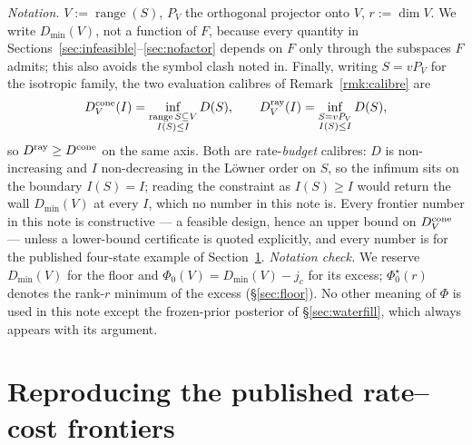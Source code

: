 \documentclass[journal]{IEEEtran}
\theoremstyle{remark}
\begin{document}
\emph{Notation.} $V:=\operatorname{range}(S)$, $P_V$ the orthogonal projector
onto $V$, $r:=\dim V$. We write $D_{\min}(V)$, not a function of $F$, because
every quantity in Sections~\ref{sec:infeasible}--\ref{sec:nofactor} depends on
$F$ only through the subspaces $F$ admits; this also avoids the symbol clash
noted in. Finally, writing $S=vP_V$ for the isotropic
family, the two evaluation calibres of
Remark~\ref{rmk:calibre} are
\[
 D^{\rm cone}_{V}(I)=\inf_{\substack{\operatorname{range}S\subseteq V\\
 I(S)\le I}}D(S),\qquad
 D^{\rm ray}_{V}(I)=\inf_{\substack{S=vP_V\\ I(S)\le I}}D(S),
\]
so $D^{\rm ray}\ge D^{\rm cone}$ on the same axis. Both are rate-\emph{budget}
calibres: $D$ is non-increasing and $I$ non-decreasing in the L\"owner order on
$S$, so the infimum sits on the boundary $I(S)=I$; reading the constraint as
$I(S)\ge I$ would return the wall $D_{\min}(V)$ at every $I$, which no number in
this note is. Every frontier number in this
note is constructive --- a feasible design, hence an upper bound on
$D^{\rm cone}_{V}$ --- unless a lower-bound certificate is quoted explicitly, and
every number is for the published four-state example of
Section~\ref{sec:repro}. \emph{Notation check.} We reserve $D_{\min}(V)$ for the floor and
$\Phi_0(V)=D_{\min}(V)-j_c$ for its excess; $\Phi_0^{\star}(r)$ denotes the
rank-$r$ minimum of the excess (\S\ref{sec:floor}). No other meaning of $\Phi$
is used in this note except the frozen-prior posterior of
\S\ref{sec:waterfill}, which always appears with its argument.

\section{Reproducing the published rate--cost frontiers}
\label{sec:repro}
\end{document}
